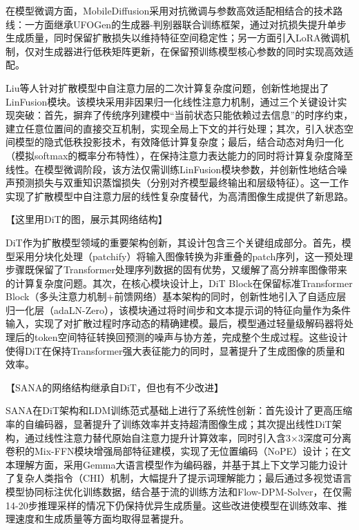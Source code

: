 \documentclass[11pt,a4paper,UTF8]{ctexart}
\begin{document}
在模型微调方面，MobileDiffusion\cite{zhao2024mobilediffusion}采用对抗微调与参数高效适配相结合的技术路线：一方面继承UFOGen\cite{xu2024ufogen}的生成器-判别器联合训练框架，通过对抗损失提升单步生成质量，同时保留扩散损失以维持特征空间稳定性；另一方面引入LoRA\cite{hu2022lora}微调机制，仅对生成器进行低秩矩阵更新，在保留预训练模型核心参数的同时实现高效适配。

Liu等人\cite{liu2024linfusion}针对扩散模型中自注意力层的二次计算复杂度问题，创新性地提出了LinFusion模块。该模块采用非因果归一化线性注意力机制，通过三个关键设计实现突破：首先，摒弃了传统序列建模中“当前状态只能依赖过去信息”的时序约束，建立任意位置间的直接交互机制，实现全局上下文的并行处理；其次，引入状态空间模型的隐式低秩投影技术，有效降低计算复杂度；最后，结合动态对角归一化（模拟softmax的概率分布特性），在保持注意力表达能力的同时将计算复杂度降至线性。在模型微调阶段，该方法仅需训练LinFusion模块参数，并创新性地结合噪声预测损失与双重知识蒸馏损失（分别对齐模型最终输出和层级特征）。这一工作实现了扩散模型中自注意力层的线性复杂度替代，为高清图像生成提供了新思路。

【这里用DiT的图，展示其网络结构】

DiT\cite{peebles2022scalable}作为扩散模型领域的重要架构创新，其设计包含三个关键组成部分。首先，模型采用分块化处理（patchify）将输入图像转换为非重叠的patch序列，这一预处理步骤既保留了Transformer处理序列数据的固有优势，又缓解了高分辨率图像带来的计算复杂度问题。其次，在核心模块设计上，DiT Block在保留标准Transformer Block（多头注意力机制+前馈网络）基本架构的同时，创新性地引入了自适应层归一化层（adaLN-Zero），该模块通过将时间步和文本提示词的特征向量作为条件输入，实现了对扩散过程时序动态的精确建模。最后，模型通过轻量级解码器将处理后的token空间特征转换回预测的噪声与协方差，完成整个生成过程。这些设计使得DiT在保持Transformer强大表征能力的同时，显著提升了生成图像的质量和效率。

【SANA的网络结构继承自DiT，但也有不少改进】

SANA\cite{xie2024sana}在DiT架构和LDM训练范式基础上进行了系统性创新：首先设计了更高压缩率的自编码器，显著提升了训练效率并支持超清图像生成；其次提出线性DiT架构，通过线性注意力替代原始自注意力提升计算效率，同时引入含3×3深度可分离卷积的Mix-FFN模块增强局部特征建模，实现了无位置编码（NoPE）设计；在文本理解方面，采用Gemma大语言模型\cite{team2024gemma}作为编码器，并基于其上下文学习能力设计了复杂人类指令（CHI）机制，大幅提升了提示词理解能力；最后通过多视觉语言模型协同标注优化训练数据，结合基于流的训练方法\cite{liu2022flow,karras2022elucidating}和Flow-DPM-Solver，在仅需14-20步推理采样的情况下仍保持优异生成质量。这些改进使模型在训练效率、推理速度和生成质量等方面均取得显著提升。
\end{document}
